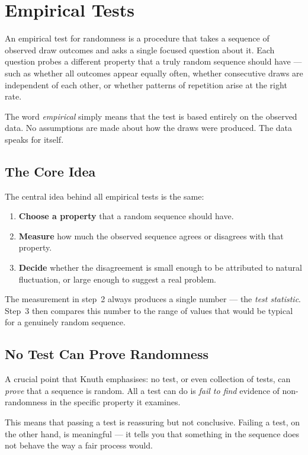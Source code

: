 \chapter{Empirical Tests}
 
An empirical test for randomness is a procedure that takes a sequence of
observed draw outcomes and asks a single focused question about it.  Each
question probes a different property that a truly random sequence should
have --- such as whether all outcomes appear equally often, whether consecutive
draws are independent of each other, or whether patterns of repetition arise
at the right rate.
 
The word \emph{empirical} simply means that the test is based entirely on
the observed data.  No assumptions are made about how the draws were
produced.  The data speaks for itself.
 
\section{The Core Idea}
 
The central idea behind all empirical tests is the same:
 
\begin{enumerate}
  \item \textbf{Choose a property} that a random sequence should have.
  \item \textbf{Measure} how much the observed sequence agrees or disagrees
        with that property.
  \item \textbf{Decide} whether the disagreement is small enough to be
        attributed to natural fluctuation, or large enough to suggest a
        real problem.
\end{enumerate}
 
The measurement in step~2 always produces a single number --- the
\emph{test statistic}.  Step~3 then compares this number to the range of
values that would be typical for a genuinely random sequence.
 
\section{No Test Can Prove Randomness}
 
A crucial point that Knuth emphasises: no test, or even collection of tests,
can \emph{prove} that a sequence is random.  All a test can do is
\emph{fail to find} evidence of non-randomness in the specific property it
examines.
 
This means that passing a test is reassuring but not conclusive.  Failing a
test, on the other hand, is meaningful --- it tells you that something in the
sequence does not behave the way a fair process would.
 
